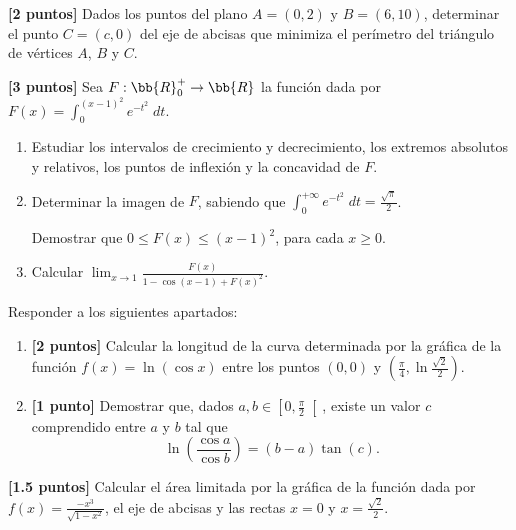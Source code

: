 \documentclass[12pt]{article}
\begin{document}
\begin{ejercicio}\textbf{[2 puntos]}
    Dados los puntos del plano $A=(0,2)$ y $B=(6,10)$, determinar el punto $C=(c,0)$ del eje de abcisas que minimiza el perímetro del triángulo de vértices $A$, $B$ y $C$.
\end{ejercicio}

\begin{ejercicio}\textbf{[3 puntos]}
    Sea $F:\bb{R}^+_0\to \bb{R}$ la función dada por $\displaystyle F(x)=\int_0^{(x-1)^2} e^{-t^2}\;dt$.
    \begin{enumerate}
        \item Estudiar los intervalos de crecimiento y decrecimiento,  los extremos absolutos y relativos, los puntos de inflexión y la concavidad de $F$.

        \item Determinar la imagen de $F$, sabiendo que $\displaystyle \int_0^{+\infty} e^{-t^2}\;dt = \frac{\sqrt{\pi}}{2}$.

        Demostrar que $0\leq F(x)\leq (x-1)^2$, para cada $x\geq 0$.

        \item Calcular $\displaystyle \lim_{x\to 1} \frac{F(x)}{1-\cos(x-1)+F(x)^2}$.
    \end{enumerate}
\end{ejercicio}


\begin{ejercicio} Responder a los siguientes apartados:
    \begin{enumerate}
        \item \textbf{[2 puntos]} Calcular la longitud de la curva determinada por la gráfica de la función $f(x)=\ln(\cos x)$ entre los puntos $(0,0)$ y $\left(\frac{\pi}{4}, \ln \frac{\sqrt{2}}{2}\right)$.

        \item \textbf{[1 punto]} Demostrar que, dados $a,b\in \left[0,\frac{\pi}{2}\right[$, existe un valor $c$ comprendido entre $a$ y $b$ tal que
        \begin{equation*}
            \ln \left(\frac{\cos a}{\cos b}\right) = (b-a)\tan(c).
        \end{equation*}
    \end{enumerate}
\end{ejercicio}

\begin{ejercicio} \textbf{[1.5 puntos]}
    Calcular el área limitada por la gráfica de la función dada por $\displaystyle f(x)=\frac{-x^3}{\sqrt{1-x^2}}$, el eje de abcisas y las rectas $x=0$ y $x=\frac{\sqrt{2}}{2}$.
\end{ejercicio}
\end{document}
